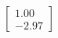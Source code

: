 \documentclass[preview]{standalone}
\begin{document}
\begin{align*}
\begin{bmatrix} 1.00 \\ -2.97 \end{bmatrix}
\end{align*}
\end{document}
